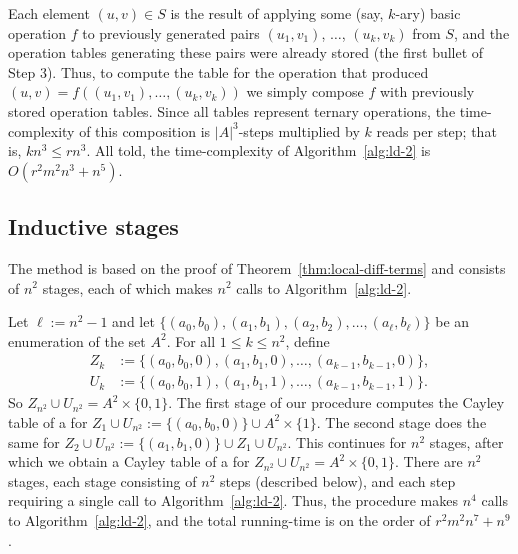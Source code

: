 Each element $(u,v)\in S$ is the result of applying some (say, $k$-ary)
basic operation $f$ to previously generated pairs $(u_1, v_1)$, $\dots$, $(u_k,v_k)$
from $S$, and the operation tables generating these pairs were
already stored (the first bullet of Step 3).  Thus, to compute the table
for the operation that produced $(u,v) = f((u_1,v_1),\dots, (u_k,v_k))$
we simply compose $f$ with previously stored operation tables.
Since all tables represent ternary operations, the time-complexity of this composition
is $|A|^3$-steps multiplied by $k$ reads per step; that is,
$kn^3 \leq rn^3$.
All told, the time-complexity of Algorithm~\ref{alg:ld-2} is %
$O(r^2m^2n^3 + n^5)$.



\subsection{Inductive stages}
The method is based on the proof of Theorem~\ref{thm:local-diff-terms} and consists of $n^2$
stages, each of which makes $n^2$ calls to Algorithm~\ref{alg:ld-2}.

\renewcommand{\l}{\ensuremath{\ell}}
Let $\l := n^2 -1$ and let $\{(a_0, b_0), (a_1, b_1), (a_2, b_2), \dots, (a_{\ell}, b_{\ell})\}$
be an enumeration of the set $A^2$.
For all $1\leq k \leq n^2$, define
\begin{align*}
  Z_k &:= \{(a_0, b_0,0),(a_1, b_1,0), \dots, (a_{k-1}, b_{k-1},0)\},\\
  U_k &:= \{(a_0, b_0,1),(a_1, b_1,1), \dots, (a_{k-1}, b_{k-1},1)\}.
\end{align*}
So $Z_{n^2} \cup U_{n^2} = A^2 \times \{0,1\}$.
The first stage of our procedure computes the Cayley table of a \ldto for
$Z_1 \cup U_{n^2}:= \{(a_0, b_0, 0)\} \cup A^2 \times \{1\}$.
The second stage does the same for
$Z_2 \cup U_{n^2} := \{(a_1, b_1, 0) \} \cup Z_1 \cup U_{n^2}$.
This continues for $n^2$ stages, after which we obtain a Cayley table of a \ldto for
$Z_{n^2} \cup U_{n^2} = A^2 \times \{0,1\}$.
There are $n^2$ stages, each stage consisting of $n^2$ steps (described below),
and each step requiring a single call to Algorithm~\ref{alg:ld-2}.
Thus, the procedure makes $n^4$ calls to Algorithm~\ref{alg:ld-2}, and
the total running-time is on the order of $r^2m^2n^7 + n^9$.

